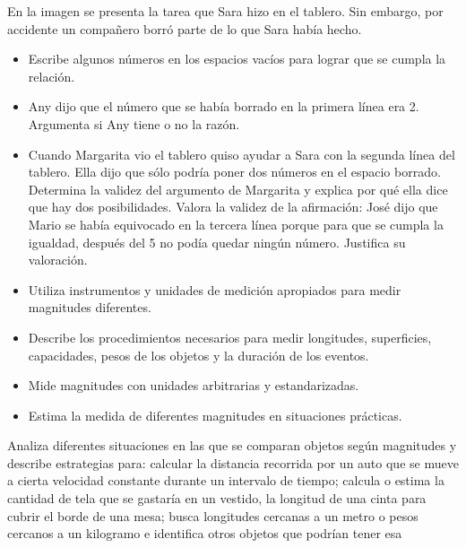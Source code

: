 \ejemplo

En la imagen se presenta la tarea que Sara hizo en el tablero. Sin embargo, por accidente un compañero borró parte de lo que Sara había hecho.


\begin{itemize}
  \item Escribe algunos números en los espacios vacíos para lograr que se cumpla la relación.
  \item Any dijo que el número que se había borrado en la primera línea era 2. Argumenta si Any tiene o no la razón.
  \item Cuando Margarita vio el tablero quiso ayudar a Sara con la segunda línea del tablero. Ella dijo que sólo podría poner dos números en el espacio borrado. Determina la validez del argumento de Margarita y explica por qué ella dice que hay dos posibilidades. Valora la validez de la afirmación: José dijo que Mario se había equivocado en la tercera línea porque para que se cumpla la igualdad, después del 5 no podía quedar ningún número. Justifica su valoración.
\end{itemize}


\evidencias

\begin{itemize}
  \item Utiliza instrumentos y unidades de medición apropiados para medir magnitudes diferentes.
  \item Describe los procedimientos necesarios para medir longitudes, superficies, capacidades, pesos de los objetos y la duración de los eventos.
  \item Mide magnitudes con unidades arbitrarias y estandarizadas.
  \item Estima la medida de diferentes magnitudes en situaciones prácticas.
\end{itemize}

\ejemplo

Analiza diferentes situaciones en las que se comparan objetos según magnitudes y describe estrategias para: calcular la distancia recorrida por un auto que se mueve a cierta velocidad constante durante un intervalo de tiempo; calcula o estima la cantidad de tela que se gastaría en un vestido, la longitud de una cinta para cubrir el borde de una mesa; busca longitudes cercanas a un metro o pesos cercanos a un kilogramo e identifica otros objetos que podrían tener esa

